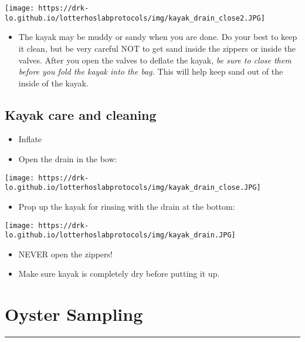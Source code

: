 \documentclass[
  letterpaper,
  DIV=11,
  numbers=noendperiod]{scrreprt}
\providecommand{\tightlist}{%
  \setlength{\itemsep}{0pt}\setlength{\parskip}{0pt}}\usepackage{longtable,booktabs,array}
\begin{document}
\texttt{[image: https://drk-lo.github.io/lotterhoslabprotocols/img/kayak\_drain\_close2.JPG]}

\begin{itemize}
\tightlist
\item
  The kayak may be muddy or sandy when you are done. Do your best to
  keep it clean, but be very careful NOT to get sand inside the zippers
  or inside the valves. After you open the valves to deflate the kayak,
  \emph{be sure to close them before you fold the kayak into the bag.}
  This will help keep sand out of the inside of the kayak.
\end{itemize}

\hypertarget{kayak-care-and-cleaning}{%
\section*{\texorpdfstring{\textbf{Kayak care and
cleaning}}{Kayak care and cleaning}}\label{kayak-care-and-cleaning}}

\begin{itemize}
\item
  Inflate
\item
  Open the drain in the bow:
\end{itemize}

\texttt{[image: https://drk-lo.github.io/lotterhoslabprotocols/img/kayak\_drain\_close.JPG]}

\begin{itemize}
\tightlist
\item
  Prop up the kayak for rinsing with the drain at the bottom:
\end{itemize}

\texttt{[image: https://drk-lo.github.io/lotterhoslabprotocols/img/kayak\_drain.JPG]}

\begin{itemize}
\item
  NEVER open the zippers!
\item
  Make sure kayak is completely dry before putting it up.
\end{itemize}

\hypertarget{oyster-sampling}{%
\chapter{Oyster Sampling}\label{oyster-sampling}}

\begin{center}\rule{0.5\linewidth}{0.5pt}\end{center}
\end{document}
